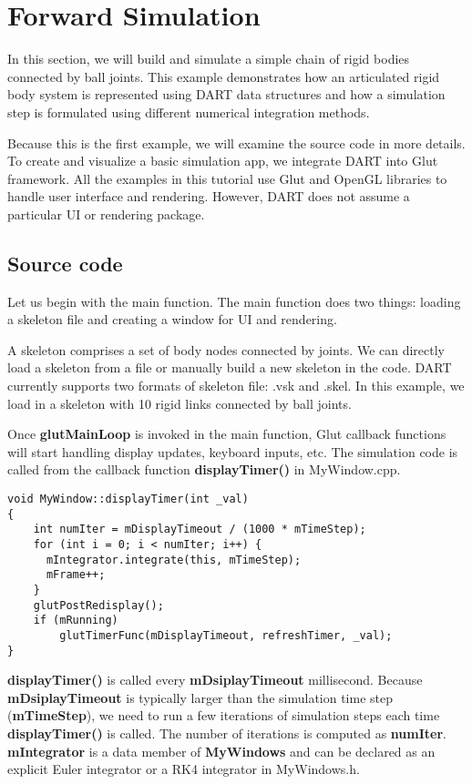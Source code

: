 \section{Forward Simulation}
In this section, we will build and simulate a simple chain of rigid
bodies connected by ball joints. This example demonstrates how an
articulated rigid body system is represented using DART data
structures and how a simulation step is formulated using different
numerical integration methods.

Because this is the first example, we will examine the source code in
more details. To create and visualize a basic simulation app, we
integrate DART into Glut framework. All the examples in this tutorial
use Glut and OpenGL libraries to handle user interface and
rendering. However, DART does not assume a particular UI or rendering
package. 


\subsection{Source code}
Let us begin with the main function. The main function does two
things: loading a skeleton file and creating a window for UI and
rendering. 

A skeleton comprises a set of body nodes connected by
joints. We can directly load a skeleton from a file or manually build a new
skeleton in the code. DART currently supports two formats of skeleton
file: .vsk and .skel. In this example, we load in a skeleton with 10
rigid links connected by ball joints. 

Once \textbf{glutMainLoop} is invoked in the main function, Glut
callback functions will start handling display updates, keyboard
inputs, etc. The simulation code is called from the callback function
\textbf{displayTimer()} in MyWindow.cpp.

\ttfamily
\begin{lstlisting}[label=displayTimer,caption=displayTimer]
void MyWindow::displayTimer(int _val)
{
    int numIter = mDisplayTimeout / (1000 * mTimeStep);
    for (int i = 0; i < numIter; i++) {
      mIntegrator.integrate(this, mTimeStep);
      mFrame++;
    }
    glutPostRedisplay();
    if (mRunning)	
        glutTimerFunc(mDisplayTimeout, refreshTimer, _val);
}
\end{lstlisting}
\rmfamily
\textbf{displayTimer()} is called every \textbf{mDsiplayTimeout}
millisecond. Because \textbf{mDsiplayTimeout} is typically larger than
the simulation time step (\textbf{mTimeStep}), we need to run a few
iterations of simulation steps each time \textbf{displayTimer()} is
called. The number of iterations is computed as
\textbf{numIter}. \textbf{mIntegrator} is a data member of
\textbf{MyWindows} and can be declared as an explicit Euler integrator
or a RK4 integrator in MyWindows.h.

